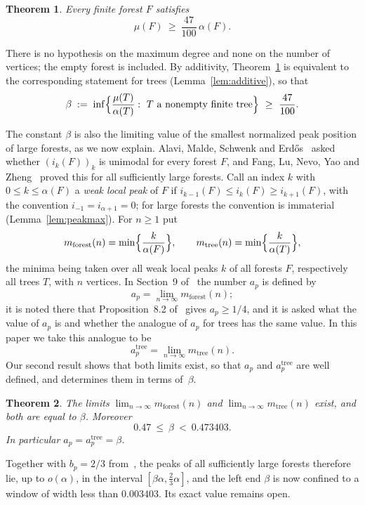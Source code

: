 \documentclass{amsart}
\numberwithin{equation}{section}
\theoremstyle{plain}
\newtheorem{theorem}{Theorem}[section]
\theoremstyle{definition}
\theoremstyle{remark}
\begin{document}
\begin{theorem}\label{thm:main}
Every finite forest $F$ satisfies
\[
\mu(F)\ \ge\ \frac{47}{100}\,\alpha(F).
\]
\end{theorem}

There is no hypothesis on the maximum degree and none on the number of vertices; the empty forest is included. By additivity, Theorem~\ref{thm:main} is equivalent to the corresponding statement for trees (Lemma~\ref{lem:additive}), so that
\[
\beta\;:=\;\inf\Bigl\{\frac{\mu(T)}{\alpha(T)}:\ T\text{ a nonempty finite tree}\Bigr\}\ \ge\ \frac{47}{100}.
\]

The constant $\beta$ is also the limiting value of the smallest normalized peak position of large forests, as we now explain. Alavi, Malde, Schwenk and Erd\H{o}s~\cite{AMSE} asked whether $(i_k(F))_k$ is unimodal for every forest $F$, and Fang, Lu, Nevo, Yao and Zheng~\cite{FLNYZ} proved this for all sufficiently large forests. Call an index $k$ with $0\le k\le\alpha(F)$ a \emph{weak local peak} of $F$ if $i_{k-1}(F)\le i_k(F)\ge i_{k+1}(F)$, with the convention $i_{-1}=i_{\alpha+1}=0$; for large forests the convention is immaterial (Lemma~\ref{lem:peakmax}). For $n\ge1$ put
\[
m_{\mathrm{forest}}(n)=\min\Bigl\{\frac{k}{\alpha(F)}\Bigr\},\qquad m_{\mathrm{tree}}(n)=\min\Bigl\{\frac{k}{\alpha(T)}\Bigr\},
\]
the minima being taken over all weak local peaks $k$ of all forests $F$, respectively all trees $T$, with $n$ vertices. In Section~9 of~\cite{FLNYZ} the number $a_p$ is defined by
\[
a_p=\lim_{n\to\infty}m_{\mathrm{forest}}(n);
\]
it is noted there that Proposition~8.2 of~\cite{FLNYZ} gives $a_p\ge 1/4$, and it is asked what the value of $a_p$ is and whether the analogue of $a_p$ for trees has the same value. In this paper we take this analogue to be
\[
a_p^{\mathrm{tree}}=\lim_{n\to\infty}m_{\mathrm{tree}}(n).
\]
Our second result shows that both limits exist, so that $a_p$ and $a_p^{\mathrm{tree}}$ are well defined, and determines them in terms of~$\beta$.

\begin{theorem}\label{thm:peaks}
The limits $\lim_{n\to\infty}m_{\mathrm{forest}}(n)$ and $\lim_{n\to\infty}m_{\mathrm{tree}}(n)$ exist, and both are equal to $\beta$. Moreover
\[
0.47\ \le\ \beta\ <\ 0.473403 .
\]
In particular $a_p=a_p^{\mathrm{tree}}=\beta$.
\end{theorem}

Together with $b_p=2/3$ from~\cite{FLNYZ}, the peaks of all sufficiently large forests therefore lie, up to $o(\alpha)$, in the interval $[\beta\alpha,\tfrac23\alpha]$, and the left end $\beta$ is now confined to a window of width less than $0.003403$. Its exact value remains open.
\end{document}
